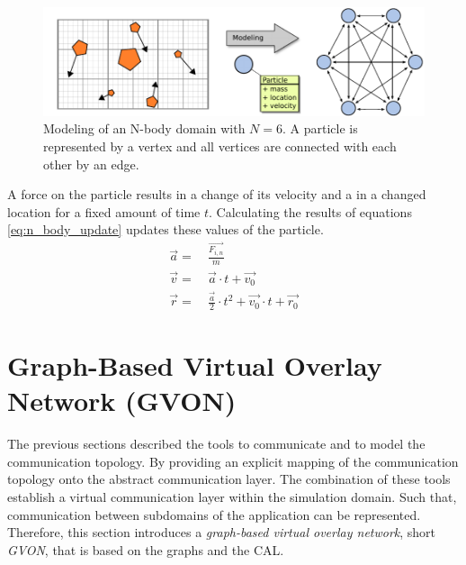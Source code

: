 \begin{figure}[H]
  \centering \includegraphics[width=\textwidth]{graphics/30_nbody_modeling}
  \caption{Modeling of an N-body domain with $N = 6$. A particle is represented
  by a vertex and all vertices are connected with each other by an edge.}
  \label{fig:nbody_modeling}
\end{figure}

A force on the particle results in a change of its velocity and a
in a changed location for a fixed amount of time $t$. Calculating
the results of equations \ref{eq:n_body_update} updates these
values of the particle.
\begin{align}
  \label{eq:n_body_update}
  \overrightarrow{a} =&~ \frac{\overrightarrow{F_{i,n}}}{m}\\
  \overrightarrow{v} =&~ \overrightarrow{a} \cdot t + \overrightarrow{v_0}\\
  \overrightarrow{r} =&~ \frac{\overrightarrow{a}}{2} \cdot t^2 + \overrightarrow{v_0} \cdot t + \overrightarrow{r_0}
\end{align}




\section{Graph-Based Virtual Overlay Network (GVON)}
\label{sec:gvon}
The previous sections described the tools to communicate and to model
the communication topology. By providing an explicit mapping of the
communication topology onto the abstract communication layer. The
combination of these tools establish a virtual communication layer
within the simulation domain.  Such that, communication between
subdomains of the application can be represented. Therefore, this
section introduces a \textit{graph-based virtual overlay network},
short \textit{GVON}, that is based on the graphs and the CAL.

